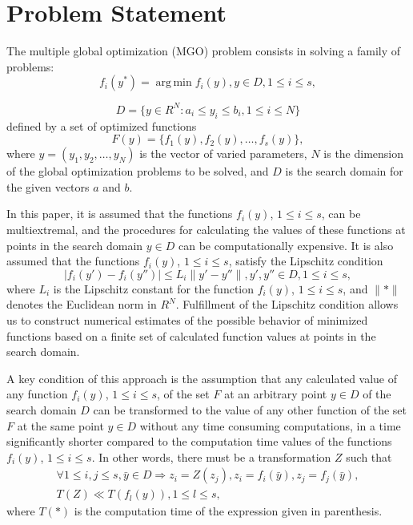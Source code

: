 \documentclass[review]{elsarticle}
\DeclareMathOperator*{\argmin}{arg\,min}
\begin{document}
\section{Problem Statement}\label{sec:2}

The multiple global optimization (MGO) problem consists in solving a family of problems:
\begin{equation}\label{eq:1}
f_i(y^*) = \argmin f_i(y), y \in D, 1 \leq i \leq s,
\end{equation}

\begin{equation}\label{eq:2}
D  = \{ y\in R^N: a_i \leq y_i \leq b_i, 1 \leq i \leq N \}
\end{equation}
defined by a set of optimized functions
\begin{equation}\label{eq:3}
F(y) = \{ f_1(y),  f_2(y),\dots, f_s(y) \},
\end{equation}
where $y = (y_1,y_2,\dots,y_N)$ is the vector of varied parameters, $N$ is the dimension of the global optimization problems to be solved, and $D$ is the search domain for the given vectors $a$ and $b$. 

In this paper, it is assumed that the functions $f_i(y)$, $1 \leq i \leq s$, can be multiextremal, and the procedures for calculating the values of these functions at points in the search domain $y \in D$ can be computationally expensive. It is also assumed that the functions $f_i(y)$, $1 \leq i \leq s$, satisfy the Lipschitz condition
\begin{equation}\label{eq:4}
|f_i (y')-f_i (y'')| \leq L_i \|y'-y''\|, y',y''\in D, 1 \leq i \leq s,
\end{equation}
where $L_i$ is the Lipschitz constant for the function $f_i(y)$, $1 \leq i \leq s$, and ${\|*\|}$ denotes the Euclidean norm in $R^N$. Fulfillment of the Lipschitz condition allows us to construct numerical estimates of the possible behavior of minimized functions based on a finite set of calculated function values at points in the search domain.


A key condition of this approach is the assumption that any calculated value of any function $f_i(y)$, $1 \leq i \leq s$, of the set $F$ at an arbitrary point $y \in D$ of the search domain $D$ can be transformed to the value of any other function of the set $F$ at the same point $y \in D$ without any time consuming computations, in a time significantly shorter compared to the computation time values of the functions $f_i(y)$, $1 \leq i \leq s$. In other words, there must be a transformation $Z$ such that
\begin{equation}\label{eq:5}
\begin{matrix}
\forall 1 \leq i, j \leq s, \bar{y} \in D \Rightarrow z_i=Z(z_j ), z_i = f_i (\bar{y}),z_j=f_j (\bar{y}), \\
T(Z) \ll T(f_l (y) ),1 \leq l \leq s,
\end{matrix}
\end{equation}
where $T(*)$  is the computation time of the expression given in parenthesis.
\end{document}
